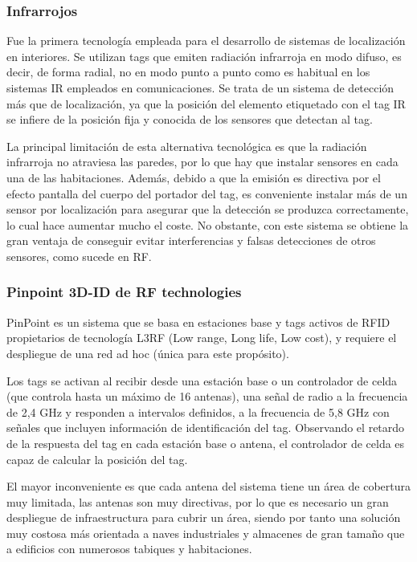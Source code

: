 \subsubsection{Infrarrojos}

Fue la primera tecnología empleada para el desarrollo de sistemas de localización en interiores. Se utilizan tags que emiten radiación infrarroja en modo difuso, es decir, de forma radial, no en modo punto a punto como es habitual en los sistemas IR empleados en comunicaciones. Se trata de un sistema de detección más que de localización, ya que la posición del elemento etiquetado con el tag IR se infiere de la posición fija y conocida de los sensores que detectan al tag. 

La principal limitación de esta alternativa tecnológica es que la radiación infrarroja no atraviesa las paredes, por lo que hay que instalar sensores en cada una de las habitaciones. Además, debido a que la emisión es directiva por el efecto pantalla del cuerpo del portador del tag, es conveniente instalar más de un sensor por localización para asegurar que la detección se produzca correctamente, lo cual hace aumentar mucho el coste. No obstante, con este sistema se obtiene la gran ventaja de conseguir evitar interferencias y falsas detecciones de otros sensores, como sucede en RF. 

\subsubsection{Pinpoint 3D-ID de RF technologies}

PinPoint es un sistema que se basa en estaciones base y tags activos de RFID propietarios de tecnología L3RF (Low range, Long life, Low cost), y requiere el despliegue de una red ad hoc (única para este propósito). 

Los tags se activan al recibir desde una estación base o un controlador de celda (que controla hasta un máximo de 16 antenas), una señal de radio a la frecuencia de 2,4 GHz y responden a intervalos definidos, a la frecuencia de 5,8 GHz con señales que incluyen información de identificación del tag. Observando el retardo de la respuesta del tag en cada estación base o antena, el controlador de celda es capaz de calcular la posición del tag. 

El mayor inconveniente es que cada antena del sistema tiene un área de cobertura muy limitada, las antenas son muy directivas, por lo que es necesario un gran despliegue de infraestructura para cubrir un área, siendo por tanto una solución muy costosa más orientada a naves industriales y almacenes de gran tamaño que a edificios con numerosos tabiques y habitaciones. 

